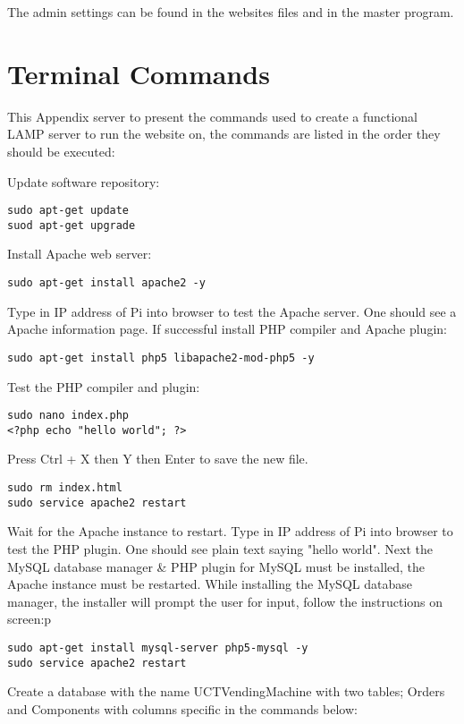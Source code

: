 \documentclass[a4paper,11pt]{article}
\numberwithin{figure}{section}
\numberwithin{table}{section}
\begin{document}
\begin{appendices}
The admin settings can be found in the websites files and in the master program. 

\newpage

\section{Terminal Commands}
\label{sec:PiCommands}

This Appendix server to present the commands used to create a functional LAMP server to run the website on, the commands are listed in the order they should be executed:

Update software repository:
\begin{lstlisting}
sudo apt-get update
suod apt-get upgrade
\end{lstlisting}
Install Apache web server:
\begin{lstlisting}[firstnumber=3]
sudo apt-get install apache2 -y
\end{lstlisting}
Type in IP address of Pi into browser to test the Apache server. One should see a Apache information page. If successful install PHP compiler and Apache plugin:
\begin{lstlisting}[firstnumber=4]
sudo apt-get install php5 libapache2-mod-php5 -y
\end{lstlisting}
Test the PHP compiler and plugin:
\begin{lstlisting}[firstnumber=5]
sudo nano index.php
<?php echo "hello world"; ?>
\end{lstlisting}
Press Ctrl + X then Y then Enter to save the new file.
\begin{lstlisting}[firstnumber=7]
sudo rm index.html
sudo service apache2 restart
\end{lstlisting}
Wait for the Apache instance to restart. Type in IP address of Pi into browser to test the PHP plugin. One should see plain text saying "hello world". Next the MySQL database manager \& PHP plugin for MySQL must be installed, the Apache instance must be restarted. While installing the MySQL database manager, the installer will prompt the user for input, follow the instructions on screen:p
\begin{lstlisting}[firstnumber=9]
sudo apt-get install mysql-server php5-mysql -y
sudo service apache2 restart
\end{lstlisting}
Create a database with the name UCTVendingMachine with two tables; Orders and Components with columns specific in the commands below:
\begin{lstlisting}[firstnumber=11]

\end{lstlisting}
\end{appendices}
\end{document}

